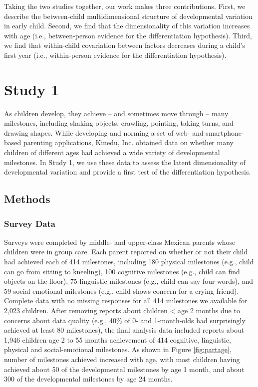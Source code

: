 \documentclass[man, floatsintext]{apa7}
\begin{document}
Taking the two studies together, our work makes three contributions.
First, we describe the between-child multidimensional structure of
developmental variation in early child. Second, we find that the
dimensionality of this variation increases with age (i.e., between-person evidence for the differentiation hypothesis). Third, we find that
within-child covariation between factors decreases during a child's
first year (i.e., within-person evidence for the differentiation hypothesis).

\section{Study 1}

As children develop, they achieve -- and sometimes move through -- many milestones,
including shaking objects, crawling, pointing, taking turns, and drawing
shapes. While developing and norming a set of web- and smartphone-based
parenting applications, Kinedu, Inc. obtained data on whether many
children of different ages had achieved a wide variety of developmental milestones. In Study 1, we use these data to assess the latent dimensionality of developmental variation and provide a first test of the differentiation hypothesis.

\subsection{Methods}

\subsubsection{Survey Data}

Surveys were completed by
middle- and upper-class Mexican parents whose children were in group
care. Each parent reported on whether or not
their child had achieved each of 414 milestones, including 180
physical milestones (e.g., child can go from sitting to kneeling), 100
cognitive milestones (e.g., child can find objects on the floor), 75
linguistic milestones (e.g., child can say four words), and 59
social-emotional milestones (e.g., child shows concern for a crying
friend). Complete data with no missing responses for all 414 milestones we available for 2,023 children. After removing reports about children < age 2 months due to concerns about data quality (e.g., 40\% of 0- and 1-month-olds had surprisingly achieved at least 80
milestones), the final analysis data included reports about 1,946 children age 2 to 55
months achievement of 414 cognitive, linguistic, physical and
social-emotional milestones. As shown in Figure \ref{fig:partage}, number of milestones achieved increased with age, with most
children having achieved about 50 of the developmental milestones by age 1 month, and about 300 of the developmental milestones by age 24 months.
\end{document}

